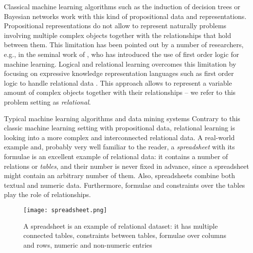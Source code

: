 Classical machine learning algorithms such as the induction of decision trees
\parencite{decision_trees} or Bayesian networks \parencite{pearl} work
with this kind of propositional data and representations.  Propositional representations do not allow to
represent naturally problems involving multiple complex objects
together with the relationships that hold between them. This limitation has been
pointed out by a number of researchers, e.g., in the seminal work of
\textcite{plotkin}, who has introduced  the use of first order logic
for machine learning. Logical and relational learning 
overcomes this limitation by focusing on expressive knowledge
representation languages such as first order logic to handle
relational data \parencite{luc_book}. This approach allows to represent a variable amount of complex objects together with their
relationships -- we refer to this problem setting as \textit{relational}.


Typical machine learning algorithms and data mining systems 
Contrary to this classic machine learning setting with propositional
data, relational learning is looking into a more complex and
interconnected relational data. A real-world example and, probably
very well familiar to the reader, a \textit{spreadsheet} with its formulae is an
excellent example of relational data: it contains a number of
relations or \textit{tables}, and their number is never fixed in
advance, since a spreadsheet might contain an arbitrary number of
them. Also, spreadsheets combine both textual and numeric data. Furthermore,
formulae and constraints over the tables play the role of relationships.

\begin{figure}[thb]
  \begin{center}
    \texttt{[image: spreadsheet.png]}
  \end{center}
  \caption{A spreadsheet is an example of relational dataset: it has multiple connected tables, constraints between tables, formulae over columns and rows, numeric and non-numeric entries}
  \label{fig:spreadsheet_example_intro}
\end{figure}


